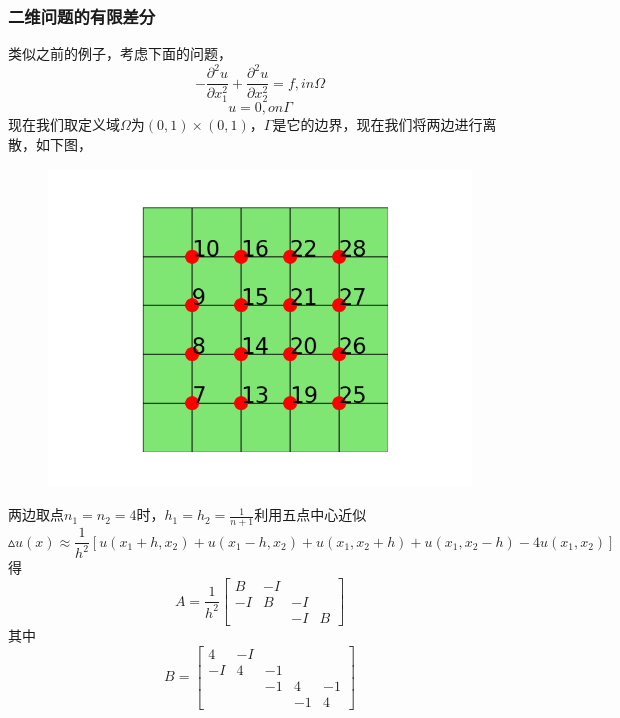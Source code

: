 \documentclass{article}
\begin{document}



\subsubsection{二维问题的有限差分}
类似之前的例子，考虑下面的问题，
$$-\dfrac{\partial ^2u}{\partial x_1^2}+\dfrac{\partial ^2u}{\partial x_2^2}=f,in \Omega $$
$$u=0, on \Gamma$$
现在我们取定义域$\Omega$为$(0,1)\times (0,1)$，$\Gamma$是它的边界，现在我们将两边进行离散，如下图，
\begin{figure}[H]
\centering
\includegraphics[scale=0.7]{./figures/1.png}
\caption{}
\end{figure}
两边取点$n_1=n_2=4$时，$h_1=h_2=\frac{1}{n+1}$利用五点中心近似
$$\vartriangle u(x)\approx\frac{1}{h^2}[u(x_1+h,x_2)+u(x_1-h,x_2)+u(x_1,x_2+h)+u(x_1,x_2-h)-4u(x_1,x_2)]$$
得
$$A=\frac{1}{h^2}\begin{bmatrix}
B & {-I}\\
-I & B & {-I}\\
 & & {-I} & B
\end{bmatrix}$$
其中
$$B=\begin{bmatrix}
4 & {-I}\\
-I & 4 & {-1}\\
 & & {-1} & 4 & {-1}\\
 & & & {-1} & 4
 \end{bmatrix}$$
\end{document}
